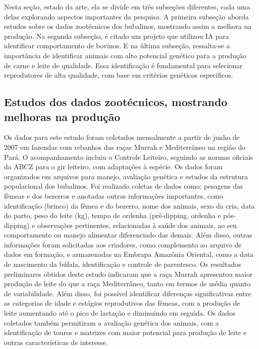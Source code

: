Nesta seção, estado da arte, ela se divide em três subseções diferentes, cada uma delas explorando aspectos importantes da pesquisa. A primeira subseção aborda estudos sobre os dados zootécnicos dos bubalinos, mostrando assim a melhora na produção. Na segunda subseção, é citado um projeto que utilizou IA para identificar comportamento de bovinos. E na última subseção, ressalta-se a importância de identificar animais com alto potencial genético para a produção de carne e leite de qualidade. Essa identificação é fundamental para selecionar reprodutores de alta qualidade, com base em critérios genéticos específicos.

 \subsection*{Estudos dos dados zootécnicos, mostrando melhoras na produção}
 
  Os dados para este estudo foram coletados mensalmente a partir de junho de 2007 em fazendas com rebanhos das raças Murrah e Mediterrâneo na região do Pará. O acompanhamento incluiu o Controle Leiteiro, seguindo as normas oficiais da ABCZ para o gir leiteiro, com adaptações à espécie. Os dados foram organizados em arquivos para manejo, avaliação genética e estudos da estrutura populacional dos bubalinos. 
  Foi realizado coletas de dados como:  pesagens das fêmeas e dos bezerros e anotadas outras informações importantes, como identificação (brinco) da fêmea e do bezerro, nome dos animais, sexo da cria, data do parto, peso do leite (kg), tempo de ordenha (pré-dipping, ordenha e pós-dipping) e observações pertinentes, relacionadas à saúde dos animais, ao seu comportamento ou manejo alimentar diferenciado das demais. Além disso, outras informações foram solicitadas aos criadores, como complemento ao arquivo de dados em formação, e armazenadas na Embrapa Amazônia Oriental, como a data de nascimento da búfala, identificação e controle de parentesco. 
 Os resultados preliminares  obtidos deste estudo indicaram que a raça Murrah apresentou maior produção de leite do que a raça Mediterrâneo, tanto em termos de média quanto de variabilidade. Além disso, foi possível identificar diferenças significativas entre as categorias de idade e estágios reprodutivos das fêmeas, com a produção de leite aumentando até o pico de lactação e diminuindo em seguida. Os dados coletados também permitiram a avaliação genética dos animais, com a identificação de touros e matrizes com maior potencial para produção de leite e outras características de interesse. \cite{Righetti.C}




